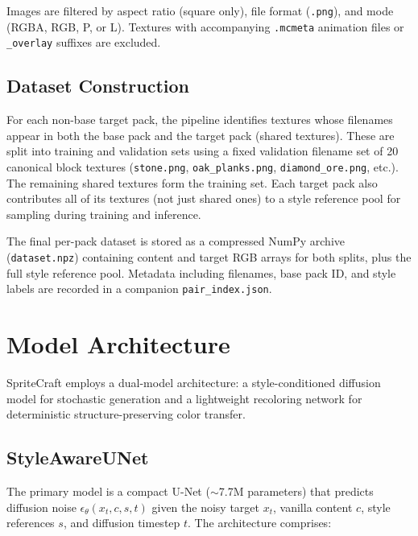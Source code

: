 Images are filtered by aspect ratio (square only), file format (\texttt{.png}), and mode (RGBA, RGB, P, or L). Textures with accompanying \texttt{.mcmeta} animation files or \texttt{\_overlay} suffixes are excluded.

\subsection{Dataset Construction}

For each non-base target pack, the pipeline identifies textures whose filenames appear in both the base pack and the target pack (shared textures). These are split into training and validation sets using a fixed validation filename set of 20 canonical block textures (\texttt{stone.png}, \texttt{oak\_planks.png}, \texttt{diamond\_ore.png}, etc.). The remaining shared textures form the training set. Each target pack also contributes all of its textures (not just shared ones) to a style reference pool for sampling during training and inference.

The final per-pack dataset is stored as a compressed NumPy archive (\texttt{dataset.npz}) containing content and target RGB arrays for both splits, plus the full style reference pool. Metadata including filenames, base pack ID, and style labels are recorded in a companion \texttt{pair\_index.json}.

\section{Model Architecture}

SpriteCraft employs a dual-model architecture: a style-conditioned diffusion model for stochastic generation and a lightweight recoloring network for deterministic structure-preserving color transfer.


\subsection{StyleAwareUNet}

The primary model is a compact U-Net ($\sim$7.7M parameters) that predicts diffusion noise $\epsilon_\theta(x_t, c, s, t)$ given the noisy target $x_t$, vanilla content $c$, style references $s$, and diffusion timestep $t$. The architecture comprises:


